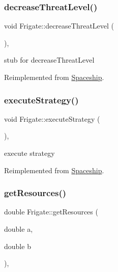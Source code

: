 \subsubsection{\texorpdfstring{decrease\+Threat\+Level()}{decreaseThreatLevel()}}
{\footnotesize\ttfamily void Frigate\+::decrease\+Threat\+Level (\begin{DoxyParamCaption}{ }\end{DoxyParamCaption})\hspace{0.3cm}{\ttfamily [inline]}, {\ttfamily [virtual]}}

stub for decrease\+Threat\+Level 

Reimplemented from \hyperlink{classSpaceship_a73a1eefd211e9a2063d924ee85f0c0c7}{Spaceship}.

\mbox{\label{classFrigate_a53468965646268e73e9cf49c3b013c40}} 
\subsubsection{\texorpdfstring{execute\+Strategy()}{executeStrategy()}}
{\footnotesize\ttfamily void Frigate\+::execute\+Strategy (\begin{DoxyParamCaption}{ }\end{DoxyParamCaption})\hspace{0.3cm}{\ttfamily [inline]}, {\ttfamily [virtual]}}

execute strategy 

Reimplemented from \hyperlink{classSpaceship}{Spaceship}.

\mbox{\label{classFrigate_a333512076606313c57fc9957dccf9cb9}} 
\subsubsection{\texorpdfstring{get\+Resources()}{getResources()}}
{\footnotesize\ttfamily double Frigate\+::get\+Resources (\begin{DoxyParamCaption}\item[{double}]{a,  }\item[{double}]{b }\end{DoxyParamCaption})\hspace{0.3cm}{\ttfamily [inline]}, {\ttfamily [virtual]}}


